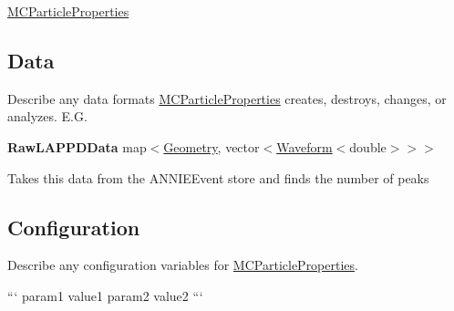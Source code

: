 \hyperlink{classMCParticleProperties}{M\-C\-Particle\-Properties}

\subsection*{Data}

Describe any data formats \hyperlink{classMCParticleProperties}{M\-C\-Particle\-Properties} creates, destroys, changes, or analyzes. E.\-G.

{\bfseries Raw\-L\-A\-P\-P\-D\-Data} {\ttfamily map$<$\hyperlink{classGeometry}{Geometry}, vector$<$\hyperlink{classWaveform}{Waveform}$<$double$>$$>$$>$}
\begin{DoxyItemize}
\item Takes this data from the {\ttfamily A\-N\-N\-I\-E\-Event} store and finds the number of peaks
\end{DoxyItemize}

\subsection*{Configuration}

Describe any configuration variables for \hyperlink{classMCParticleProperties}{M\-C\-Particle\-Properties}.

``` param1 value1 param2 value2 ``` 